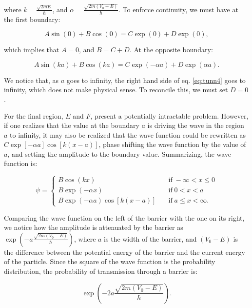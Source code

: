 \documentclass[
  9pt,
]{extbook}
\theoremstyle{definition}
\theoremstyle{definition}
\theoremstyle{definition}
\theoremstyle{remark}
\begin{document}
where \(k=\frac{\sqrt{2mE}}{\hbar}\), and \(\alpha=\frac{\sqrt{2m(V_0-E)}}{\hbar}\). To enforce continuity, we must have at the first boundary:

\begin{equation}
A\sin(0) +B \cos(0)=C\exp(0)+D\exp(0),
\label{eq:tunn3}  
\end{equation}

which implies that \(A=0\), and \(B=C+D\). At the opposite boundary:

\begin{equation}
A\sin(ka) +B \cos(ka)=C\exp(-\alpha a)+D\exp(\alpha a).
\label{eq:tunn4}  
\end{equation}

We notice that, as \(a\) goes to infinity, the right hand side of eq. \eqref{eq:tunn4} goes to infinity, which does not make physical sense. To reconcile this, we must set \(D=0\).

For the final region, \(E\) and \(F\), present a potentially intractable problem. However, if one realizes that the value at the boundary \(a\) is driving the wave in the region \(a\) to infinity, it may also be realized that the wave function could be rewritten as \(C\exp[-\alpha a]\cos[k(x-a)]\), phase shifting the wave function by the value of \(a\),
and setting the amplitude to the boundary value. Summarizing, the wave function is:

\begin{equation}
\psi=\begin{cases} B\cos (kx)\quad&\text{if}\; -\infty<x\leq 0 \\ B \exp(-\alpha x)  \quad&\text{if}\; 0<x<a \\ B\exp(-\alpha a)\cos[k(x-a)] \quad&\text{if}\; a\leq x< \infty. \end{cases}
\label{eq:tunn5}  
\end{equation}

Comparing the wave function on the left of the barrier with the one on its right, we notice how the amplitude is attenuated by the barrier as \(\exp\left(-a\frac{\sqrt{2m(V_0-E)}}{\hbar}\right)\), where \(a\) is the width of the barrier, and \((V_0-E)\) is the difference between the potential energy of the barrier and the current energy of the particle. Since the square of the wave function is the probability distribution, the probability of transmission through a barrier is:

\begin{equation}
\exp\left(-2a\frac{\sqrt{2m(V_0-E)}}{\hbar}\right).
\label{eq:tunn6}  
\end{equation}
\end{document}
